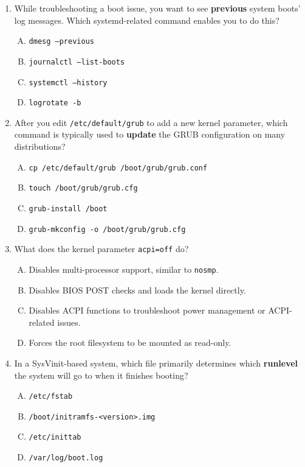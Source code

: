 \documentclass[12pt,a4paper]{report}
\begin{document}
\begin{enumerate}[1.]
    \item While troubleshooting a boot issue, you want to see \textbf{previous} system boots’ log messages. Which systemd-related command enables you to do this?
      \begin{enumerate}[A)]
        \item \texttt{dmesg --previous}
        \item \texttt{journalctl --list-boots}
        \item \texttt{systemctl --history}
        \item \texttt{logrotate -b}
      \end{enumerate}
    
    \item After you edit \texttt{/etc/default/grub} to add a new kernel parameter, which command is typically used to \textbf{update} the GRUB configuration on many distributions?
      \begin{enumerate}[A)]
        \item \texttt{cp /etc/default/grub /boot/grub/grub.conf}
        \item \texttt{touch /boot/grub/grub.cfg}
        \item \texttt{grub-install /boot}
        \item \texttt{grub-mkconfig -o /boot/grub/grub.cfg}
      \end{enumerate}
    
    \item What does the kernel parameter \texttt{acpi=off} do?
      \begin{enumerate}[A)]
        \item Disables multi-processor support, similar to \texttt{nosmp}.
        \item Disables BIOS POST checks and loads the kernel directly.
        \item Disables ACPI functions to troubleshoot power management or ACPI-related issues.
        \item Forces the root filesystem to be mounted as read-only.
      \end{enumerate}
    
    \item In a SysVinit-based system, which file primarily determines which \textbf{runlevel} the system will go to when it finishes booting?
      \begin{enumerate}[A)]
        \item \texttt{/etc/fstab}
        \item \texttt{/boot/initramfs-<version>.img}
        \item \texttt{/etc/inittab}
        \item \texttt{/var/log/boot.log}
      \end{enumerate}
    

\end{enumerate}
\end{document}
